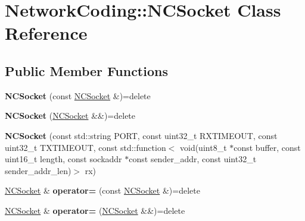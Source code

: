 \hypertarget{class_network_coding_1_1_n_c_socket}{}\section{Network\+Coding\+:\+:N\+C\+Socket Class Reference}
\label{class_network_coding_1_1_n_c_socket}
\subsection*{Public Member Functions}
\begin{DoxyCompactItemize}
\item 
{\bfseries N\+C\+Socket} (const \hyperlink{class_network_coding_1_1_n_c_socket}{N\+C\+Socket} \&)=delete\hypertarget{class_network_coding_1_1_n_c_socket_a23e2cac75f11b839938b2acbaf3acaa7}{}\label{class_network_coding_1_1_n_c_socket_a23e2cac75f11b839938b2acbaf3acaa7}

\item 
{\bfseries N\+C\+Socket} (\hyperlink{class_network_coding_1_1_n_c_socket}{N\+C\+Socket} \&\&)=delete\hypertarget{class_network_coding_1_1_n_c_socket_a135586fbe7ba03e08a258172bf32bd44}{}\label{class_network_coding_1_1_n_c_socket_a135586fbe7ba03e08a258172bf32bd44}

\item 
{\bfseries N\+C\+Socket} (const std\+::string P\+O\+RT, const uint32\+\_\+t R\+X\+T\+I\+M\+E\+O\+UT, const uint32\+\_\+t T\+X\+T\+I\+M\+E\+O\+UT, const std\+::function$<$ void(uint8\+\_\+t $\ast$const buffer, const uint16\+\_\+t length, const sockaddr $\ast$const sender\+\_\+addr, const uint32\+\_\+t sender\+\_\+addr\+\_\+len)$>$ rx)\hypertarget{class_network_coding_1_1_n_c_socket_acf1ee3b4bebbe25a6dd6dfdee9b1fdfb}{}\label{class_network_coding_1_1_n_c_socket_acf1ee3b4bebbe25a6dd6dfdee9b1fdfb}

\item 
\hyperlink{class_network_coding_1_1_n_c_socket}{N\+C\+Socket} \& {\bfseries operator=} (const \hyperlink{class_network_coding_1_1_n_c_socket}{N\+C\+Socket} \&)=delete\hypertarget{class_network_coding_1_1_n_c_socket_a440c01c767596edc5dab1bc9f80824f3}{}\label{class_network_coding_1_1_n_c_socket_a440c01c767596edc5dab1bc9f80824f3}

\item 
\hyperlink{class_network_coding_1_1_n_c_socket}{N\+C\+Socket} \& {\bfseries operator=} (\hyperlink{class_network_coding_1_1_n_c_socket}{N\+C\+Socket} \&\&)=delete\hypertarget{class_network_coding_1_1_n_c_socket_ab8ca12964a95b2a54d86a7b4e6325ca9}{}\label{class_network_coding_1_1_n_c_socket_ab8ca12964a95b2a54d86a7b4e6325ca9}


\end{DoxyCompactItemize}

